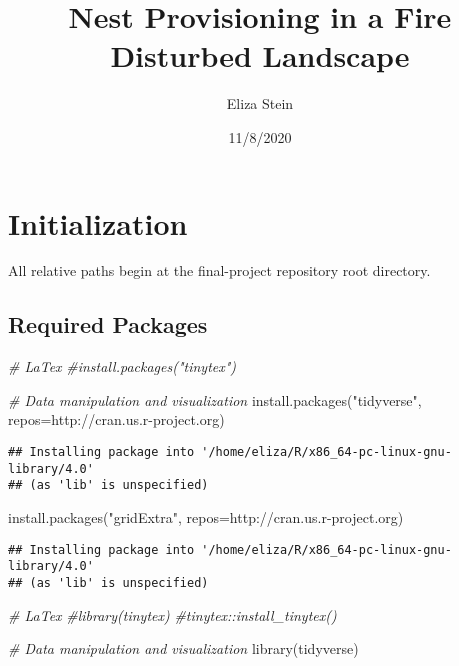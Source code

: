 \documentclass[
]{article}
\title{Nest Provisioning in a Fire Disturbed Landscape}
\author{Eliza Stein}
\date{11/8/2020}
\newenvironment{Shaded}{\begin{snugshade}}{\end{snugshade}}
\newcommand{\AttributeTok}[1]{\textcolor[rgb]{0.77,0.63,0.00}{#1}}
\newcommand{\CommentTok}[1]{\textcolor[rgb]{0.56,0.35,0.01}{\textit{#1}}}
\newcommand{\FunctionTok}[1]{\textcolor[rgb]{0.00,0.00,0.00}{#1}}
\newcommand{\NormalTok}[1]{#1}
\newcommand{\StringTok}[1]{\textcolor[rgb]{0.31,0.60,0.02}{#1}}
\begin{document}
\maketitle

\hypertarget{initialization}{%
\section{Initialization}\label{initialization}}

All relative paths begin at the final-project repository root directory.

\hypertarget{required-packages}{%
\subsection{Required Packages}\label{required-packages}}

\begin{Shaded}
\begin{Highlighting}[]
\CommentTok{\# LaTex}
\CommentTok{\#install.packages("tinytex")}

\CommentTok{\# Data manipulation and visualization}
\FunctionTok{install.packages}\NormalTok{(}\StringTok{"tidyverse"}\NormalTok{, }\AttributeTok{repos=}\StringTok{\textquotesingle{}http://cran.us.r{-}project.org\textquotesingle{}}\NormalTok{)}
\end{Highlighting}
\end{Shaded}

\begin{verbatim}
## Installing package into '/home/eliza/R/x86_64-pc-linux-gnu-library/4.0'
## (as 'lib' is unspecified)
\end{verbatim}

\begin{Shaded}
\begin{Highlighting}[]
\FunctionTok{install.packages}\NormalTok{(}\StringTok{"gridExtra"}\NormalTok{, }\AttributeTok{repos=}\StringTok{\textquotesingle{}http://cran.us.r{-}project.org\textquotesingle{}}\NormalTok{)}
\end{Highlighting}
\end{Shaded}

\begin{verbatim}
## Installing package into '/home/eliza/R/x86_64-pc-linux-gnu-library/4.0'
## (as 'lib' is unspecified)
\end{verbatim}

\begin{Shaded}
\begin{Highlighting}[]
\CommentTok{\# LaTex}
\CommentTok{\#library(tinytex)}
\CommentTok{\#tinytex::install\_tinytex()}

\CommentTok{\# Data manipulation and visualization}
\FunctionTok{library}\NormalTok{(tidyverse)}
\end{Highlighting}
\end{Shaded}
\end{document}
